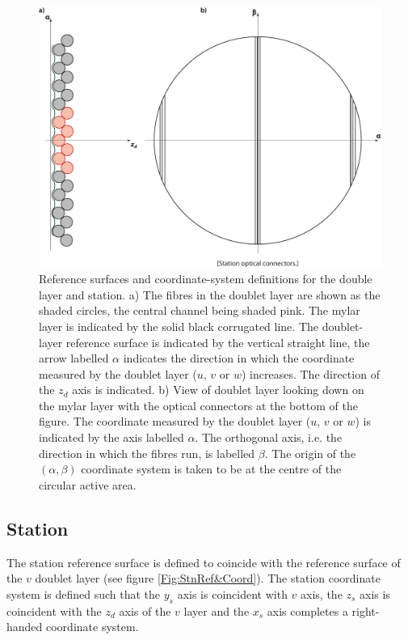 \begin{figure}
  \begin{center}
    \includegraphics[width=0.7\linewidth] {detectors/tracker/03-Reference-surfaces-and-coordinate-systems/Figures/doublet-layer.pdf}
  \end{center}
  \caption{ Reference surfaces and coordinate-system definitions for the double layer and station. a) The fibres in the doublet layer are shown as the shaded circles, the central channel being shaded pink. The mylar layer is indicated by the solid black corrugated line. The doublet-layer reference surface is indicated by the vertical straight line, the arrow labelled $\alpha$ indicates the direction in which the coordinate measured by the doublet layer ($u$, $v$ or $w$) increases. The direction of the $z_d$ axis is indicated. b) View of doublet layer looking down on the mylar layer with the optical connectors at the bottom of the figure. The coordinate measured by the doublet layer ($u$, $v$ or $w$) is indicated by the axis labelled $\alpha$. The orthogonal axis, i.e. the direction in which the fibres run, is labelled $\beta$. The origin of the $(\alpha, \beta)$ coordinate system is taken to be at the centre of the circular active area.}
  \label{Fig:DblLyrRef&Coord}
\end{figure}

\subsection{Station}
\label{SubSect:RefCoordStn}

The station reference surface is defined to coincide with the reference surface of the $v$ doublet layer (see figure \ref{Fig:StnRef&Coord}). The station coordinate system is defined such that the $y_s$ axis is coincident with $v$ axis, the $z_s$ axis is coincident with the $z_d$ axis of the $v$ layer and the $x_s$ axis completes a right-handed coordinate system.


